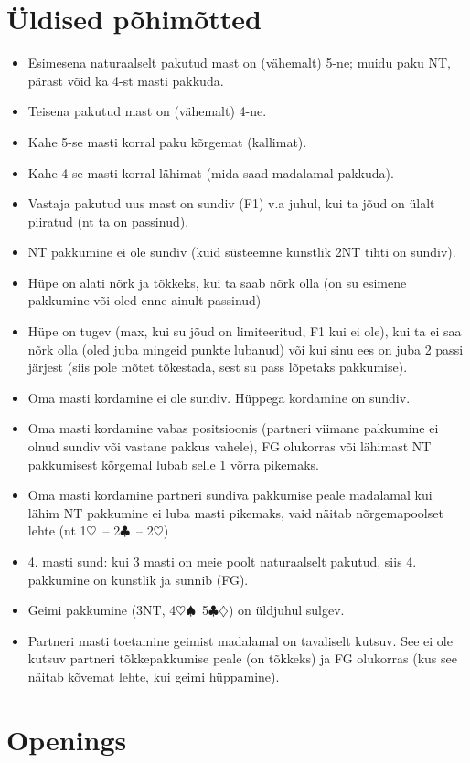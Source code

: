\documentclass[10pt]{article}
\renewcommand{\c}{$\clubsuit$}
\renewcommand{\d}{$\diamondsuit$}
\newcommand{\h}{$\heartsuit$}
\newcommand{\s}{$\spadesuit$}
\begin{document}
\begin{multicols*}{2}
\section{Üldised põhimõtted}

\begin{itemize}
\item Esimesena naturaalselt pakutud mast on (vähemalt) 5-ne; muidu paku NT, pärast võid ka 4-st masti pakkuda.
\item Teisena pakutud mast on (vähemalt) 4-ne.
\item Kahe 5-se masti korral paku kõrgemat (kallimat).
\item Kahe 4-se masti korral lähimat (mida saad madalamal pakkuda).
\item Vastaja pakutud uus mast on sundiv (F1) v.a juhul, kui ta jõud on ülalt piiratud (nt ta on passinud).
\item NT pakkumine ei ole sundiv (kuid süsteemne kunstlik 2NT tihti on sundiv).
\item Hüpe on alati nõrk ja tõkkeks, kui ta saab nõrk olla (on su esimene pakkumine või oled enne ainult passinud)
\item Hüpe on tugev (max, kui su jõud on limiteeritud, F1 kui ei ole), kui ta ei saa nõrk olla (oled juba mingeid punkte lubanud) või kui sinu ees on juba 2 passi järjest (siis pole mõtet tõkestada, sest su pass lõpetaks pakkumise).
\item Oma masti kordamine ei ole sundiv. Hüppega kordamine on sundiv.
\item Oma masti kordamine vabas positsioonis (partneri viimane pakkumine ei olnud sundiv või vastane pakkus vahele), FG olukorras või lähimast NT pakkumisest kõrgemal lubab selle 1 võrra pikemaks.
\item Oma masti kordamine partneri sundiva pakkumise peale madalamal kui lähim NT pakkumine ei luba masti pikemaks, vaid näitab nõrgemapoolset lehte (nt 1\h\ – 2\c\ – 2\h)
\item 4. masti sund: kui 3 masti on meie poolt naturaalselt pakutud, siis 4. pakkumine on kunstlik ja sunnib (FG).
\item Geimi pakkumine (3NT, 4\h \s\ 5\c \d ) on üldjuhul sulgev.
\item Partneri masti toetamine geimist madalamal on tavaliselt kutsuv. See ei ole kutsuv partneri tõkkepakkumise peale (on tõkkeks) ja FG olukorras (kus see näitab kõvemat lehte, kui geimi hüppamine).
\end{itemize}


\newpage
\section{Openings}


\end{multicols*}
\end{document}
